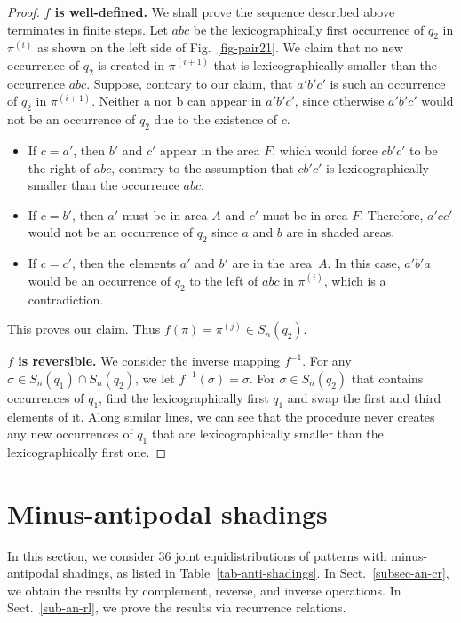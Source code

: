 \documentclass[12pt]{article}
\begin{document}
\begin{proof}
\textbf{$f$ is well-defined.} 
We shall prove the sequence described above terminates in finite steps.
Let $abc$ be the lexicographically first occurrence of $q_2$ in $\pi^{(i)}$ as shown on the left side of Fig.~\ref{fig-pair21}.
We claim that no new occurrence of $q_2$ is created in $\pi^{(i+1)}$ that is lexicographically smaller than the occurrence $abc$.
Suppose, contrary to our claim, that  $a'b'c'$ is such an occurrence of $q_2$ in $\pi^{(i+1)}$. Neither a nor b can appear in $a'b'c'$, since otherwise $a'b'c'$ would not be an occurrence of $q_2$ due to the existence of $c$. 
\begin{itemize}
    \item If $c=a'$, then $b'$ and $c'$  appear in the  area $F$, which would force $cb'c'$ to be the right of $abc$, contrary to the assumption that $cb'c'$ is lexicographically smaller than the occurrence $abc$.
    \item  If $c=b'$, then $a'$ must be in area $A$ and $c'$ must be in area $F$. Therefore, $a'cc'$ would not be an occurrence of $q_2$ since $a$ and $b$ are in shaded areas.
    \item  If $c = c'$, then the elements $a'$ and $b'$ are in the area~$A$.
In this case, $a'b'a$ would be an occurrence of $q_2$ to the left of $abc$ in $\pi^{(i)}$, which is a contradiction.
\end{itemize}
This proves our claim. Thus $f(\pi)=\pi^{(j)} \in S_n(q_2)$. 

\textbf{$f$ is reversible.} We consider the inverse mapping $f^{-1}$. For any $\sigma \in S_n(q_1) \cap S_n(q_2)$, we let $f^{-1}(\sigma)=\sigma$. For $\sigma\in S_n(q_2)$ that contains occurrences of $q_1$, find the lexicographically first $q_1$ and swap the first and third elements of it. Along similar lines, we can see that the procedure never creates any new occurrences of $q_1$ that are lexicographically smaller than the lexicographically first one. 
\end{proof}



\section{Minus-antipodal shadings}\label{sec-an-sy}


In this section, we consider 36 joint equidistributions of patterns with minus-antipodal shadings, as listed in Table~\ref{tab-anti-shadings}. In Sect.~\ref{subsec-an-cr}, we obtain the results by complement, reverse, and inverse operations. In Sect.~\ref{sub-an-rl}, we prove the results via recurrence relations. 
\end{document}
